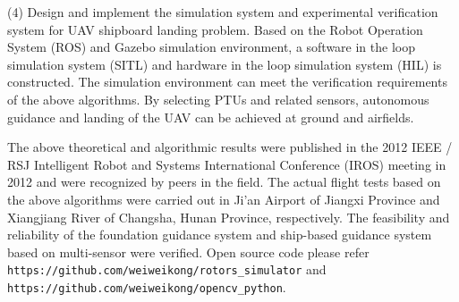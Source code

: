 \begin{eabstract}
(4) Design and implement the simulation system and experimental verification system for UAV shipboard landing problem. Based on the Robot Operation System (ROS) and Gazebo simulation environment, a software in the loop simulation system (SITL) and hardware in the loop simulation system (HIL) is constructed. The simulation environment can meet the verification requirements of the above algorithms. By selecting PTUs and related sensors, autonomous guidance and landing of the UAV can be achieved at ground and airfields.

The above theoretical and algorithmic results were published in the 2012 IEEE / RSJ Intelligent Robot and Systems International Conference (IROS) meeting in 2012 and were recognized by peers in the field. The actual flight tests based on the above algorithms were carried out in Ji'an Airport of Jiangxi Province and Xiangjiang River of Changsha, Hunan Province, respectively. The feasibility and reliability of the foundation guidance system and ship-based guidance system based on multi-sensor were verified. Open source code please refer \texttt{https://github.com/weiweikong/rotors\_simulator} and \\ \texttt{https://github.com/weiweikong/opencv\_python}.
 
 
\end{eabstract}

